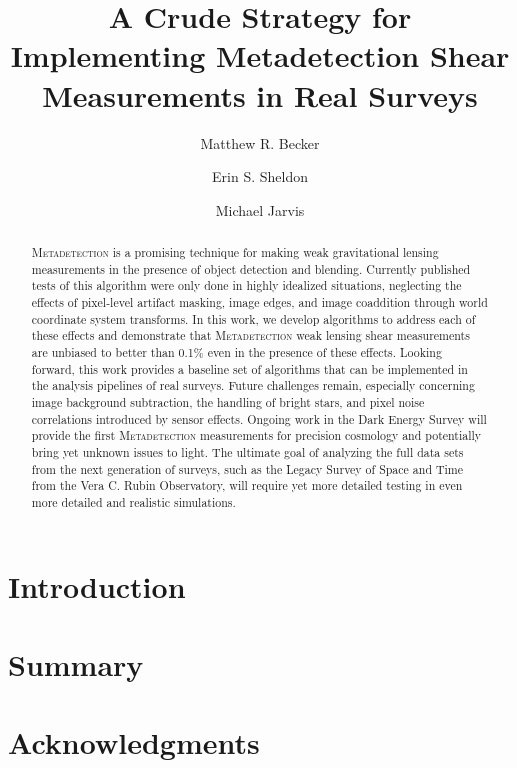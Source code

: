 \documentclass[twocolappendix, appendixfloats, numberedappendix, twocolumn, apj]{openjournal}
\newcommand{\mdet}{\textsc{Metadetection}\xspace}
\begin{document}
\title{A Crude Strategy for Implementing Metadetection Shear Measurements in Real Surveys}

\author{Matthew R. Becker}
\author{Erin S. Sheldon}
\author{Michael Jarvis}


\begin{abstract}
\mdet is a promising technique for making weak gravitational lensing measurements in the presence of
object detection and blending. Currently published tests of this algorithm were only done in
highly idealized situations, neglecting the effects of pixel-level artifact masking, image edges,
and image coaddition through world coordinate system transforms. In this work, we develop algorithms
to address each of these effects and demonstrate that \mdet weak lensing shear measurements are
unbiased to better than 0.1\% even in the presence of these effects. Looking forward, this work provides
a baseline set of algorithms that can be implemented in the analysis pipelines of real surveys.
Future challenges remain, especially concerning image background subtraction, the handling of bright stars, and
pixel noise correlations introduced by sensor effects. Ongoing work in the Dark Energy Survey
will provide the first \mdet measurements for precision cosmology and potentially bring yet unknown issues
to light. The ultimate goal of analyzing the full data sets from the next generation of surveys, such as the
Legacy Survey of Space and Time from the Vera C. Rubin Observatory, will require yet more detailed
testing in even more detailed and realistic simulations.
\end{abstract}


\section{Introduction}\label{sec:intro}

\section{Summary}\label{sec:conc}

\section*{Acknowledgments}
\end{document}
